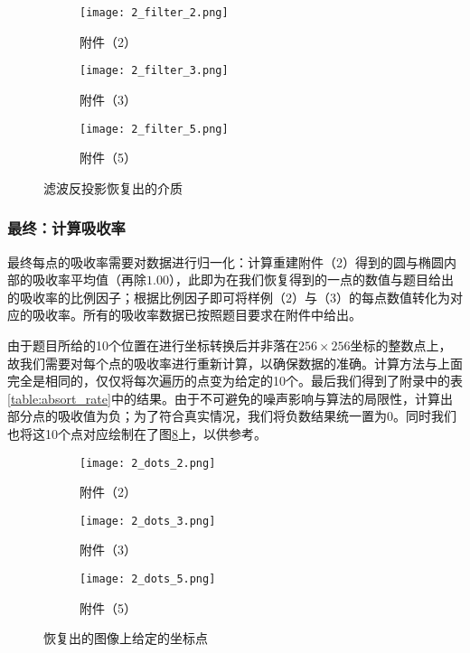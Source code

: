 \begin{figure}[htbp]
  \centering

  \begin{subfigure}[b]{0.3\textwidth}
    \texttt{[image: 2\_filter\_2.png]}
    \caption{附件（2）}
    \label{fig:2_filter:2}
  \end{subfigure}%
  \hfill
  \begin{subfigure}[b]{0.3\textwidth}
    \texttt{[image: 2\_filter\_3.png]}
    \caption{附件（3）}
    \label{fig:2_filter:3}
  \end{subfigure}%
  \hfill
  \begin{subfigure}[b]{0.3\textwidth}
    \texttt{[image: 2\_filter\_5.png]}
    \caption{附件（5）}
    \label{fig:2_filter:5}
  \end{subfigure}

  \caption{滤波反投影恢复出的介质}
  \label{fig:2_filter}
\end{figure}

\subsubsection{最终：计算吸收率}

最终每点的吸收率需要对数据进行归一化：计算重建附件（2）得到的圆与椭圆内部的吸收率平均值（再除$1.00$），此即为在我们恢复得到的一点的数值与题目给出的吸收率的比例因子；根据比例因子即可将样例（2）与（3）的每点数值转化为对应的吸收率。所有的吸收率数据已按照题目要求在附件中给出。

由于题目所给的10个位置在进行坐标转换后并非落在$256 \times 256$坐标的整数点上，故我们需要对每个点的吸收率进行重新计算，以确保数据的准确。计算方法与上面完全是相同的，仅仅将每次遍历的点变为给定的10个。最后我们得到了附录中的表\ref{table:absort_rate}中的结果。由于不可避免的噪声影响与算法的局限性，计算出部分点的吸收值为负；为了符合真实情况，我们将负数结果统一置为$0$。同时我们也将这10个点对应绘制在了图\ref{fig:2_dots}上，以供参考。

\begin{figure}[htbp]
  \centering

  \begin{subfigure}[b]{0.3\textwidth}
    \texttt{[image: 2\_dots\_2.png]}
    \caption{附件（2）}
    \label{fig:2_dots:2}
  \end{subfigure}%
  \hfill
  \begin{subfigure}[b]{0.3\textwidth}
    \texttt{[image: 2\_dots\_3.png]}
    \caption{附件（3）}
    \label{fig:2_dots:3}
  \end{subfigure}%
  \hfill
  \begin{subfigure}[b]{0.3\textwidth}
    \texttt{[image: 2\_dots\_5.png]}
    \caption{附件（5）}
    \label{fig:2_dots:5}
  \end{subfigure}

  \caption{恢复出的图像上给定的坐标点}
  \label{fig:2_dots}
\end{figure} 